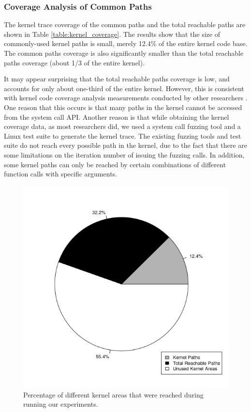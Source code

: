 \subsubsection{Coverage Analysis of Common Paths}

The kernel trace coverage of the common paths and the total reachable paths
are shown in Table \ref{table:kernel_coverage}. 
The results show that the size of commonly-used kernel paths is small,
merely 12.4\% of the entire kernel code base. 
The common paths coverage is also significantly smaller than the total
reachable paths coverage 
(about 1/3 of the entire kernel).

It may appear surprising that the total reachable paths coverage is low, 
and accounts for only about one-third of the entire kernel.  However, 
this is consistent with kernel code coverage analysis 
measurements conducted by other researchers \cite{LTP-Coverage}.
One reason that this occurs is that many paths 
in the kernel cannot be accessed from the system call API. Another reason
is that 
while obtaining the kernel coverage data, as most researchers did, we used
a system call fuzzing tool 
and a Linux test suite to generate the kernel trace. The existing fuzzing
tools and test suite do not reach every possible path in the kernel, due to 
the fact that there are some limitations on the iteration number of issuing  
the fuzzing calls. In addition, some kernel paths can only be reached by 
certain combinations of different function calls with specific arguments. 


\begin{figure}%
\centering
\includegraphics[width=1.0\columnwidth]{diagram/kernelcoverage.png}
\caption{Percentage of different kernel areas that were reached during running our experiments.} 
\label{fig:coverage}
\end{figure}


